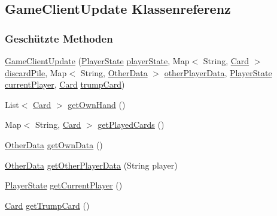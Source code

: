 \hypertarget{a00059}{\subsection{Game\-Client\-Update Klassenreferenz}
\label{a00059}
}
\subsubsection*{Geschützte Methoden}
\begin{DoxyCompactItemize}
\item 
\hyperlink{a00059_a5f144c1c37887ec0dc752d035a82f031}{Game\-Client\-Update} (\hyperlink{a00065}{Player\-State} \hyperlink{a00059_a714271f36dd46095e0a17c44fdd1cbab}{player\-State}, Map$<$ String, \hyperlink{a00054}{Card} $>$ \hyperlink{a00059_abf51aa3b896825ac08fa574e68701e86}{discard\-Pile}, Map$<$ String, \hyperlink{a00064}{Other\-Data} $>$ \hyperlink{a00059_aecd7d72c15fb82c72297bfe838053122}{other\-Player\-Data}, \hyperlink{a00065}{Player\-State} \hyperlink{a00059_aa84e85401d48f310ee9959621f6c4fba}{current\-Player}, \hyperlink{a00054}{Card} \hyperlink{a00059_ab25322829797b0de34227a8e2cdb1929}{trump\-Card})
\item 
List$<$ \hyperlink{a00054}{Card} $>$ \hyperlink{a00059_a1b82d59f9b439be5785c6faffd4d3c05}{get\-Own\-Hand} ()
\item 
Map$<$ String, \hyperlink{a00054}{Card} $>$ \hyperlink{a00059_afc0981320534aa4bae54fd59dcfcad1f}{get\-Played\-Cards} ()
\item 
\hyperlink{a00064}{Other\-Data} \hyperlink{a00059_a4173e0089631ea0b571bef5965547cf6}{get\-Own\-Data} ()
\item 
\hyperlink{a00064}{Other\-Data} \hyperlink{a00059_abb320c3a473c538ecee368f8cdd4e44b}{get\-Other\-Player\-Data} (String player)
\item 
\hyperlink{a00065}{Player\-State} \hyperlink{a00059_ad3e8a11e9c53ca1b4bb6e753e48ef5ed}{get\-Current\-Player} ()
\item 
\hyperlink{a00054}{Card} \hyperlink{a00059_a278ccc7c69243be691f69d421cf7420a}{get\-Trump\-Card} ()
\end{DoxyCompactItemize}
